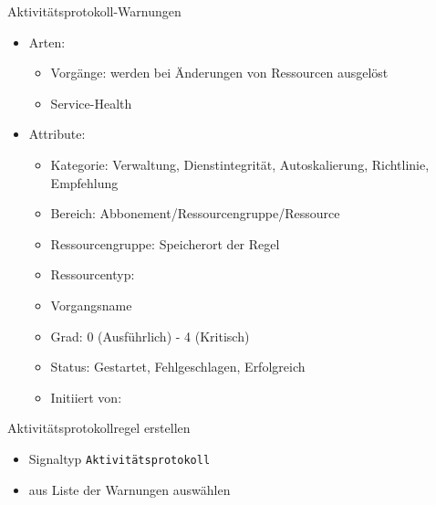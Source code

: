 \begin{flashcard}[Definition]{Aktivitätsprotokoll-Warnungen}
    \begin{itemize}
        \item Arten:
            \begin{itemize}
                \item Vorgänge: werden bei Änderungen von Ressourcen ausgelöst
                \item Service-Health
            \end{itemize}
        \item Attribute:
            \begin{itemize}
                \item Kategorie: Verwaltung, Dienstintegrität, Autoskalierung, Richtlinie, Empfehlung
                \item Bereich: Abbonement/Ressourcengruppe/Ressource
                \item Ressourcengruppe: Speicherort der Regel
                \item Ressourcentyp:
                \item Vorgangsname
                \item Grad: 0 (Ausführlich) - 4 (Kritisch)
                \item Status: Gestartet, Fehlgeschlagen, Erfolgreich
                \item Initiiert von:
            \end{itemize}
    \end{itemize}
\end{flashcard}

\begin{flashcard}[Definition]{Aktivitätsprotokollregel erstellen}
    \begin{itemize}
        \item Signaltyp \texttt{Aktivitätsprotokoll}
        \item aus Liste der Warnungen auswählen
    \end{itemize}
\end{flashcard}



